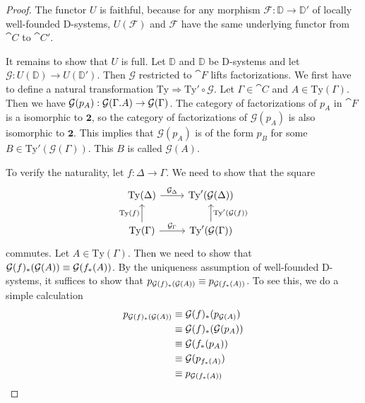 \begin{proof}
The functor $U$ is faithful, because for any morphism 
$\mathcal{F}:\mathbb{D}\to\mathbb{D}'$ of locally well-founded D-systems, 
$U(\mathcal{F})$ and $\mathcal{F}$ have the same underlying functor
from $\cat{C}$ to $\cat{C}'$. 

It remains to show that $U$ is full. Let
$\mathbb{D}$ and $\mathbb{D}$ be D-systems and let $\mathcal{G}:U(\mathbb{D})
\to U(\mathbb{D}')$. Then $\mathcal{G}$ restricted to $\cat{F}$ lifts factorizations.
We  first have to define a natural transformation
$\mathrm{Ty}\Rightarrow \mathrm{Ty}'\circ\mathcal{G}$. Let
$\Gamma\in\cat{C}$ and $A\in\mathrm{Ty}(\Gamma)$. Then we have
$\mathcal{G}(p_A):\mathcal{G}(\ctxext{\Gamma}{A})\to \mathcal{G}(\Gamma)$.
The category of factorizations of $p_A$ in $\cat{F}$ is a isomorphic to $\mathbf{2}$,
so the category of factorizations of $\mathcal{G}(p_A)$ is also isomorphic to
$\mathbf{2}$. This implies that $\mathcal{G}(p_A)$ is of the form $p_B$ for
some $B\in\mathrm{Ty}'(\mathcal{G}(\Gamma))$. This $B$ is called $\mathcal{G}(A)$.

To verify the naturality, let $f:\Delta\to\Gamma$. We need to show that the
square
\begin{equation*}
\begin{tikzcd}
\mathrm{Ty}(\Delta) \arrow[r,"{\mathcal{G}_\Delta}"] & \mathrm{Ty}'(\mathcal{G}(\Delta)) \\
\mathrm{Ty}(\Gamma) \arrow[u,"\mathrm{Ty}(f)"] \arrow[r,"{\mathcal{G}_\Gamma}"] &
\mathrm{Ty}'(\mathcal{G}(\Gamma)) \arrow[u,swap,"{\mathrm{Ty}'(\mathcal{G}(f))}"]
\end{tikzcd}
\end{equation*}
commutes. Let $A\in\mathrm{Ty}(\Gamma)$. Then we need to show that
$\mathcal{G}(f)_\ast(\mathcal{G}(A))\equiv \mathcal{G}(f_\ast(A))$. By the uniqueness
assumption of well-founded D-systems, it suffices to show that
$p_{\mathcal{G}(f)_\ast(\mathcal{G}(A))}\equiv p_{\mathcal{G}(f_\ast(A))}$. To
see this, we do a simple calculation
\begin{align*}
p_{\mathcal{G}(f)_\ast(\mathcal{G}(A))}
& \equiv \mathcal{G}(f)_\ast(p_{\mathcal{G}(A)}) \\
& \equiv \mathcal{G}(f)_\ast(\mathcal{G}(p_A)) \\
& \equiv \mathcal{G}(f_\ast(p_A)) \\
& \equiv \mathcal{G}(p_{f_\ast(A)}) \\
& \equiv p_{\mathcal{G}(f_\ast(A))} \qedhere
\end{align*}
\end{proof}

